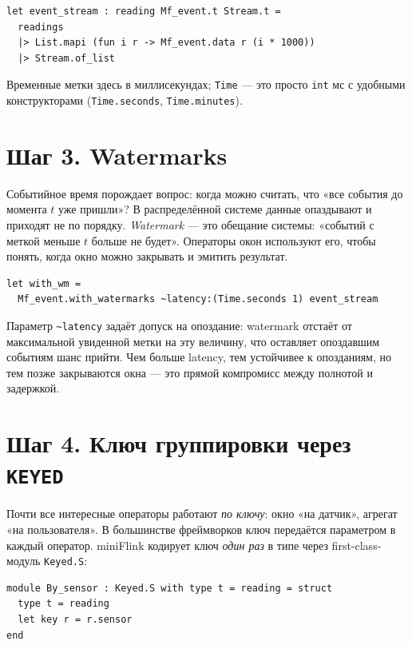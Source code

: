 \documentclass[11pt,a4paper]{article}
\begin{document}
\begin{lstlisting}
let event_stream : reading Mf_event.t Stream.t =
  readings
  |> List.mapi (fun i r -> Mf_event.data r (i * 1000))
  |> Stream.of_list
\end{lstlisting}

Временные метки здесь в миллисекундах; \texttt{Time} --- это просто
\texttt{int} мс с удобными конструкторами (\texttt{Time.seconds},
\texttt{Time.minutes}).

\section{Шаг 3. Watermarks}

Событийное время порождает вопрос: когда можно считать, что «все
события до момента $t$ уже пришли»? В распределённой системе данные
опаздывают и приходят не по порядку. \emph{Watermark} --- это обещание
системы: «событий с меткой меньше $t$ больше не будет». Операторы окон
используют его, чтобы понять, когда окно можно закрывать и эмитить
результат.

\begin{lstlisting}
let with_wm =
  Mf_event.with_watermarks ~latency:(Time.seconds 1) event_stream
\end{lstlisting}

Параметр \texttt{\textasciitilde{}latency} задаёт допуск на опоздание:
watermark отстаёт от максимальной увиденной метки на эту величину, что
оставляет опоздавшим событиям шанс прийти. Чем больше latency, тем
устойчивее к опозданиям, но тем позже закрываются окна --- это прямой
компромисс между полнотой и задержкой.

\section{Шаг 4. Ключ группировки через \texttt{KEYED}}

Почти все интересные операторы работают \emph{по ключу}: окно «на
датчик», агрегат «на пользователя». В большинстве фреймворков ключ
передаётся параметром в каждый оператор. miniFlink кодирует ключ
\emph{один раз} в типе через first-class-модуль \texttt{Keyed.S}:

\begin{lstlisting}
module By_sensor : Keyed.S with type t = reading = struct
  type t = reading
  let key r = r.sensor
end
\end{lstlisting}
\end{document}
